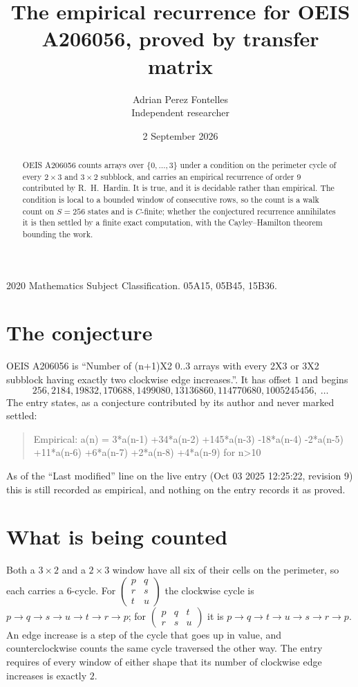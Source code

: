 \documentclass[11pt,a4paper]{article}
\title{The empirical recurrence for OEIS A206056, proved by transfer matrix}
\author{Adrian Perez Fontelles\\ \small Independent researcher}
\date{2 September 2026}
\theoremstyle{plain}
\theoremstyle{definition}
\begin{document}
\maketitle

\begin{abstract}
OEIS A206056 counts arrays over $\{0,\dots,3\}$ under a condition on the perimeter cycle of
every $2\times3$ and $3\times2$ subblock, and carries an empirical recurrence of order $9$ contributed by
R.~H.~Hardin. It is true, and it is decidable rather than empirical. The condition is local to
a bounded window of consecutive rows, so the count is a walk count on $S=256$ states and is
$C$-finite; whether the conjectured recurrence annihilates it is then settled by a finite exact
computation, with the Cayley--Hamilton theorem bounding the work.
\end{abstract}

\noindent\small 2020 Mathematics Subject Classification. 05A15, 05B45, 15B36.\normalsize

\section{The conjecture}

OEIS A206056 is ``Number of (n+1)X2 0..3 arrays with every 2X3 or 3X2 subblock having exactly two clockwise edge increases.''. It has offset $1$ and begins
\[
256, 2184, 19832, 170688, 1499080, 13136860, 114770680, 1005245456,\ \dots
\]
The entry states, as a conjecture contributed by its author and never marked settled:
\begin{quote}
Empirical: a(n) = 3*a(n-1) +34*a(n-2) +145*a(n-3) -18*a(n-4) -2*a(n-5) +11*a(n-6) +6*a(n-7) +2*a(n-8) +4*a(n-9) for n>10
\end{quote}
As of the ``Last modified'' line on the live entry (Oct 03 2025 12:25:22, revision 9) this is still
recorded as empirical, and nothing on the entry records it as proved.

\section{What is being counted}

Both a $3\times2$ and a $2\times3$ window have all six of their cells on the
perimeter, so each carries a $6$-cycle. For
$\begin{pmatrix}p&q\\r&s\\t&u\end{pmatrix}$ the clockwise cycle is
$p\to q\to s\to u\to t\to r\to p$; for
$\begin{pmatrix}p&q&t\\r&s&u\end{pmatrix}$ it is
$p\to q\to t\to u\to s\to r\to p$. An edge increase is a step of the cycle that goes up in
value, and counterclockwise counts the same cycle traversed the other way. The entry requires
of every window of either shape that its number of clockwise edge increases is exactly $2$.
\end{document}
